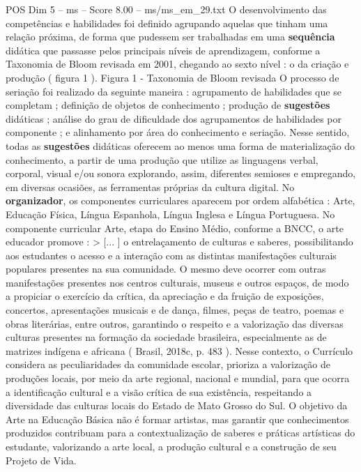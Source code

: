 \begin{textsample}{POS Dim 5 – ms – Score 8.00 – ms/ms\_em\_29.txt}
O desenvolvimento das competências e habilidades foi definido agrupando aquelas que tinham uma relação próxima, de forma que pudessem ser trabalhadas em uma \textbf{sequência} didática que passasse pelos principais níveis de aprendizagem, conforme a Taxonomia de Bloom revisada em 2001, chegando ao sexto nível : o da criação e produção ( figura 1 ).
Figura 1 - Taxonomia de Bloom revisada O processo de seriação foi realizado da seguinte maneira : agrupamento de habilidades que se completam ; definição de objetos de conhecimento ; produção de \textbf{sugestões} didáticas ; análise do grau de dificuldade dos agrupamentos de habilidades por componente ; e alinhamento por área do conhecimento e seriação.
Nesse sentido, todas as \textbf{sugestões} didáticas oferecem ao menos uma forma de materialização do conhecimento, a partir de uma produção que utilize as linguagens verbal, corporal, visual e/ou sonora explorando, assim, diferentes semioses e empregando, em diversas ocasiões, as ferramentas próprias da cultura digital.
No \textbf{organizador}, os componentes curriculares aparecem por ordem alfabética : Arte, Educação Física, Língua Espanhola, Língua Inglesa e Língua Portuguesa.
No componente curricular Arte, etapa do Ensino Médio, conforme a BNCC, o arte educador promove : > [... ] o entrelaçamento de culturas e saberes, possibilitando aos estudantes o acesso e a interação com as distintas manifestações culturais populares presentes na sua comunidade.
O mesmo deve ocorrer com outras manifestações presentes nos centros culturais, museus e outros espaços, de modo a propiciar o exercício da crítica, da apreciação e da fruição de exposições, concertos, apresentações musicais e de dança, filmes, peças de teatro, poemas e obras literárias, entre outros, garantindo o respeito e a valorização das diversas culturas presentes na formação da sociedade brasileira, especialmente as de matrizes indígena e africana ( Brasil, 2018c, p. 483 ).
Nesse contexto, o Currículo considera as peculiaridades da comunidade escolar, prioriza a valorização de produções locais, por meio da arte regional, nacional e mundial, para que ocorra a identificação cultural e a visão crítica de sua existência, respeitando a diversidade das culturas locais do Estado de Mato Grosso do Sul.
O objetivo da Arte na Educação Básica não é formar artistas, mas garantir que conhecimentos produzidos contribuam para a contextualização de saberes e práticas artísticas do estudante, valorizando a arte local, a produção cultural e a construção de seu Projeto de Vida.

\end{textsample}
